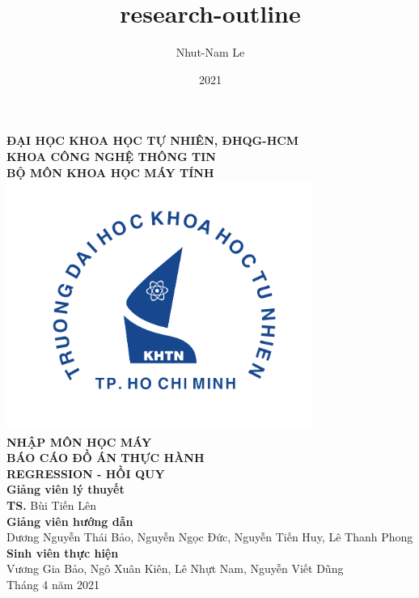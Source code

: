 \documentclass{article}
\title{research-outline}
\author{Nhut-Nam Le}
\date{2021}
\newcommand\B{\rule[-1.2ex]{0pt}{0pt}} %
\begin{document}
	\begin{titlepage}
		\begin{center}
			\large{\textbf{ĐẠI HỌC KHOA HỌC TỰ NHIÊN, ĐHQG-HCM\\KHOA CÔNG NGHỆ THÔNG TIN\\BỘ MÔN KHOA HỌC MÁY TÍNH}}\\
			\includegraphics[width=0.75\textwidth]{images/khtn.png}\\
			\large \textbf{NHẬP MÔN HỌC MÁY}\\[0.1in]
			\huge \textbf{BÁO CÁO ĐỒ ÁN THỰC HÀNH}\\[0.1in]
			\huge \textbf{REGRESSION - HỒI QUY}\\[0.1in]
			\vfill
			\normalsize
			\normalsize
			\textbf{Giảng viên lý thuyết}\\
			{\textbf{TS.} Bùi Tiến Lên}\\[0.1in]
			\textbf{Giảng viên hướng dẫn}\\
			\vspace{0.1in}
			{Dương Nguyễn Thái Bảo, Nguyễn Ngọc Đức, Nguyễn Tiến Huy, Lê Thanh Phong}\\[0.1in]
			\textbf{Sinh viên thực hiện} \\
			\vspace{0.1in}
			{Vương Gia Bảo, Ngô Xuân Kiên, Lê Nhựt Nam, Nguyễn Viết Dũng}\\[0.1in]
			\vfill
			Tháng 4 năm 2021
		\end{center}
	\end{titlepage}
	\newpage
	
	\cleardoublepage
	
\end{document}
